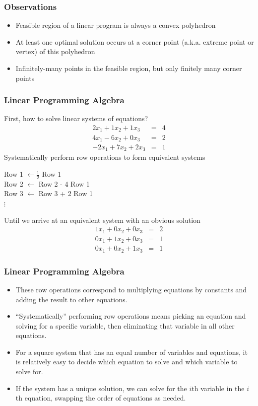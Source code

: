 \documentclass[12pt,handout]{beamer}
\begin{document}
\begin{frame}
\frametitle{Observations}
\begin{itemize}
\item Feasible region of a linear program is always a convex polyhedron
\item At least one optimal solution occurs at a corner point (a.k.a. extreme point or vertex) of this polyhedron
\item Infinitely-many points in the feasible region, but only finitely many corner points
\end{itemize}
\end{frame}

\begin{frame}
\frametitle{Linear Programming Algebra}
First, how to solve linear systems of equations?
\begin{eqnarray}
2 x_1 + 1 x_2 + 1 x_3 &=& 4 \nonumber \\
4 x_1 - 6 x_2 + 0 x_3 &=& 2 \nonumber \\
-2 x_1 + 7 x_2 + 2 x_3 &=& 1 \nonumber
\end{eqnarray}
Systematically perform row operations to form equivalent systems
\begin{center}
Row 1 $\leftarrow \frac{1}{2}$ Row 1 \\
Row 2 $\leftarrow$ Row 2 - 4 Row 1 \\
Row 3 $\leftarrow$ Row 3 + 2 Row 1 \\
$\vdots$ \\
\end{center}
Until we arrive at an equivalent system with an obvious solution
\begin{eqnarray}
1 x_1 + 0 x_2 + 0 x_3 &=& 2 \nonumber \\
0 x_1 + 1 x_2 + 0 x_3 &=& 1 \nonumber \\
0 x_1 + 0 x_2 + 1 x_3 &=& 1 \nonumber
\end{eqnarray}
\end{frame}

\begin{frame}
\frametitle{Linear Programming Algebra}
\begin{itemize}
\item These row operations correspond to multiplying equations by constants and adding the result to other equations.
\item ``Systematically'' performing row operations means picking an equation and solving for a specific variable, then eliminating that variable in all other equations.
\item For a square system that has an equal number of variables and equations, it is relatively easy to decide which equation to solve and which variable to solve for.
\item If the system has a unique solution, we can solve for the $i$th variable in the $i$th equation, swapping the order of equations as needed.
\end{itemize}
\end{frame}
\end{document}
